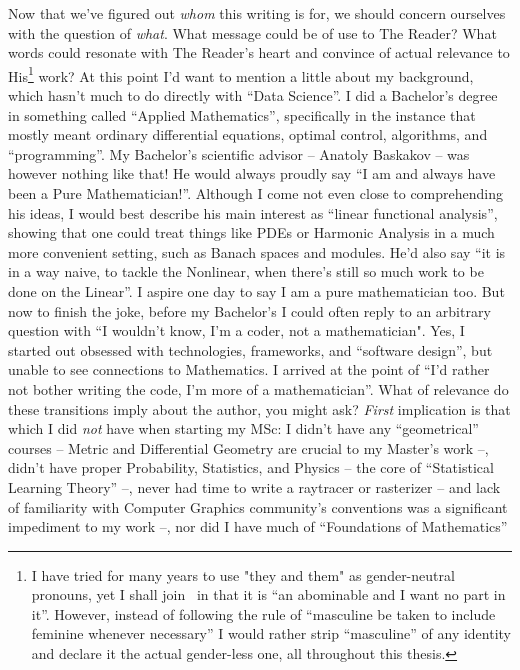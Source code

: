 Now that we've figured out \emph{whom} this writing is for, we should concern
ourselves with the question of \emph{what}. What message could be of use to The
Reader? What words could resonate with The Reader's heart and convince of
actual relevance to His\footnote{I have tried for many years to use "they and
them" as gender-neutral pronouns, yet I shall join~\cite{strictlyEnglish} in
that it is ``an abominable and I want no part in it''.  However, instead of
following the rule of ``masculine be taken to include feminine whenever
necessary'' I would rather strip ``masculine'' of any identity and declare it
the actual gender-less one, all throughout this thesis.} work?  At this point
I'd want to mention a little about my background, which hasn't much to do
directly with ``Data Science''. I did a Bachelor's degree in something called
``Applied Mathematics'', specifically in the instance that mostly meant
ordinary differential equations, optimal control, algorithms, and
``programming''. My Bachelor's scientific advisor -- Anatoly Baskakov -- was
however nothing like that! He would always proudly say ``I am and always have
been a Pure Mathematician!''.  Although I come not even close to comprehending
his ideas, I would best describe his main interest as ``linear functional
analysis'', showing that one could treat things like PDEs or Harmonic Analysis
in a much more convenient setting, such as Banach spaces and modules. He'd also
say ``it is in a way naive, to tackle the Nonlinear, when there's still so much
work to be done on the Linear''. I aspire one day to say I am a pure
mathematician too.  But now to finish the joke, before my Bachelor's I could
often reply to an arbitrary question with ``I wouldn't know, I'm a coder, not a
mathematician".  Yes, I started out obsessed with technologies, frameworks, and
``software design'', but unable to see connections to Mathematics. I arrived at
the point of ``I'd rather not bother writing the code, I'm more of a
mathematician''. What of relevance do these transitions imply about the author,
you might ask?  \emph{First} implication is that which I did \emph{not} have
when starting my MSc:  I didn't have any ``geometrical'' courses -- Metric and
Differential Geometry are crucial to my Master's work --, didn't have proper
Probability, Statistics, and Physics -- the core of ``Statistical Learning
Theory'' --, never had time to write a raytracer or rasterizer -- and lack of
familiarity with Computer Graphics community's conventions was a significant
impediment to my work --, nor did I have much of ``Foundations of Mathematics''
